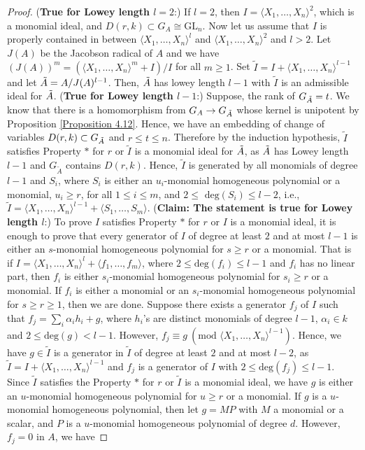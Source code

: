 \documentclass[12pt]{amsart}
\theoremstyle{definition}
\numberwithin{equation}{section}
\begin{document}
\begin{proof}
\vskip6mm
\noindent
(\textbf{True for Lowey length $l=2$}:) If $l=2$, then $I=\langle X_1,\dots, X_n\rangle^2$, which is a monomial ideal, and $D(r,k)\subset G_{A}\cong \text{GL}_n$. Now let us assume that $I$ is properly contained in between $\langle X_1,\dots,X_n\rangle^l$ and $\langle X_1,\dots,X_n \rangle^2$ and $l>2$. Let $J(A)$ be the Jacobson radical of $A$ and we have $(J(A))^m=(\langle X_1,\dots,X_n\rangle^m+I)/I$ for all $m\geq 1$. Set $\tilde{I}=I+\langle X_1,\dots,X_n\rangle^{l-1}$ and let $\Tilde{A}=A/J(A)^{l-1}$. Then, $\Tilde{A}$ has lowey length $l-1$ with $\tilde{I}$ is an admissible ideal for $\Tilde{A}$. 
\vskip4mm
\noindent
(\textbf{True for Lowey length $l-1$}:) Suppose, the rank of $G_{\Tilde{A}}=t$. We know that there is a homomorphism from $G_A\rightarrow G_{\Tilde{A}}$ whose kernel is unipotent by Proposition \ref{Proposition 4.12}. Hence, we have an embedding of change of variables $D(r,k) \subset G_{\Tilde{A}}$ and $r\leq t\leq n$. Therefore by the induction hypothesis, $\tilde{I}$ satisfies Property $*$ for $r$ or $\tilde{I}$ is a monomial ideal for $\Tilde{A}$, as $\Tilde{A}$ has Lowey length $l-1$ and $G_{\tilde{A}}$ contains $D(r,k)$. Hence, $\tilde{I}$ is generated by all monomials of degree $l-1$ and $S_i$, where $S_i$ is either an $u_i$-monomial homogeneous polynomial or a monomial, $u_i\geq r$, for all $1\leq i\leq m$, and $2\leq$ $\text{deg}(S_i)\leq l-2$, i.e., $\tilde{I}=\langle X_1,\dots,X_n\rangle^{l-1}+\langle S_1,\dots,S_m\rangle$.
\vskip4mm
\noindent
(\textbf{Claim: The statement is true for Lowey length $l$}:) To prove $I$ satisfies Property $*$ for $r$ or $I$ is a monomial ideal, it is enough to prove that every generator of $I$ of degree at least $2$ and at most $l-1$ is either an $s$-monomial homogeneous polynomial for $s\geq r$ or a monomial. That is if $I=\langle X_1,\dots, X_n\rangle^l+\langle f_1,\dots,f_m\rangle$, where $2\leq \text{deg}(f_i)\leq l-1$ and $f_i$ has no linear part, then $f_i$ is either $s_i$-monomial homogeneous polynomial for $s_i\geq r$ or a monomial. 
\vskip2mm
\noindent
If $f_i$ is either a monomial or an $s_i$-monomial homogeneous polynomial for $s\geq r\geq 1$, then we are done.  Suppose there exists a generator $f_j$ of $I$ such that $f_j=\sum_{i}\alpha_{i}h_{i}+ g$, where $h_{i}$'s are distinct monomials of degree $l-1$, $\alpha_i \in k$ and $2\leq\text{deg}(g)<l-1$. However, $f_j\equiv g \ (\text{mod }\langle X_1,\dots,X_n\rangle^{l-1})$. Hence, we have $g\in \tilde{I}$ is a generator in $\tilde{I}$ of degree at least $2$ and at most $l-2$, as $\tilde{I}=I+\langle X_1,\dots,X_n\rangle ^{l-1}$ and $f_j$ is a generator of $I$ with $2\leq \text{deg}(f_j)\leq l-1$. Since $\tilde{I}$ satisfies the Property $*$ for $r$ or $\tilde{I}$ is a monomial ideal, we have $g$ is either an $u$-monomial homogeneous polynomial for $u\geq r$ or a monomial. If $g$ is a $u$-monomial homogeneous polynomial, then let $g=MP$ with $M$ a monomial or a scalar, and $P$ is a $u$-monomial homogeneous polynomial of degree $d$.  However, $f_j=0$ in $A$, we have 

\end{proof}
\end{document}
